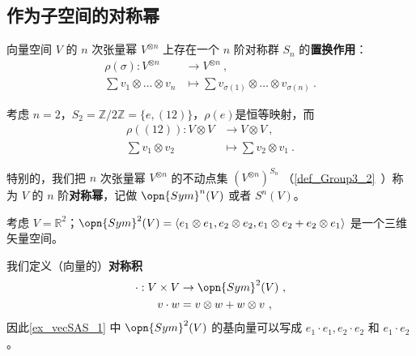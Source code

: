 
\begin{issues}
\issueTODO
{}
\end{issues}


\subsection{作为子空间的对称幂}

向量空间 $V$ 的 $n$ 次张量幂 $V^{\otimes n}$ 上存在一个 $n$ 阶对称群 $S_n$ 的\textbf{置换作用}：
\begin{equation}
\begin{aligned}
\rho(\sigma): V^{\otimes n} &\to V^{\otimes n}~, \\
\sum v_1 \otimes \dots \otimes v_n &\mapsto \sum v_{\sigma(1)} \otimes \dots \otimes v_{\sigma(n)}~.
\end{aligned}
\end{equation}

\begin{example}{}
考虑 $n = 2$，$S_2 = \mathbb{Z}/2\mathbb{Z} = \{e, (1 2)\}$，$\rho(e)$是恒等映射，而
\begin{equation}
\begin{aligned}
\rho((1 2)): V \otimes V &\to V \otimes V~, \\
\sum v_1 \otimes v_2 &\mapsto \sum v_2 \otimes v_1~.
\end{aligned}
\end{equation}
\end{example}

特别的，我们把 $n$ 次张量幂 $V^{\otimes n}$ 的不动点集 $(V^{\otimes n})^{S_n}$ （\autoref{def_Group3_2}~）称为 $V$ 的 $n$ 阶\textbf{对称幂}，记做 $\opn{Sym}^n(V)$ 或者 $S^n(V)$。

\begin{example}{}\label{ex_vecSAS_1}
考虑 $V = \mathbb{R}^2$；$\opn{Sym}^2(V) = \langle e_1 \otimes e_1, e_2 \otimes e_2, e_1 \otimes e_2 + e_2 \otimes e_1 \rangle$ 是一个三维矢量空间。
\end{example}

我们定义（向量的）\textbf{对称积}
\begin{equation}
\begin{aligned}
\cdot: V \times V &\to \opn{Sym}^2(V)~, \\
v \cdot w &= v \otimes w + w \otimes v~,
\end{aligned}
\end{equation}
因此\autoref{ex_vecSAS_1} 中 $\opn{Sym}^2(V)$ 的基向量可以写成 $e_1 \cdot e_1, e_2 \cdot e_2$ 和 $e_1 \cdot e_2$。

